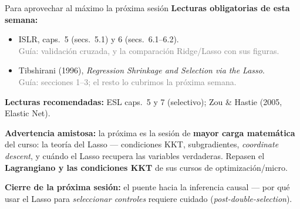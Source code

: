 \documentclass{beamer}
\newcommand{\1}{\mathbb{I}}
\begin{document}
\begin{frame}{Para aprovechar al máximo la próxima sesión}
\small
\textbf{Lecturas obligatorias de esta semana:}
\begin{itemize}\itemsep4pt
  \item ISLR, caps.\ 5 (secs.\ 5.1) y 6 (secs.\ 6.1--6.2). \\ \textcolor{gray}{Guía: validación cruzada, y la comparación Ridge/Lasso con sus figuras.}
  \item Tibshirani (1996), \emph{Regression Shrinkage and Selection via the Lasso}. \\ \textcolor{gray}{Guía: secciones 1--3; el resto lo cubrimos la próxima semana.}
\end{itemize}

\textbf{Lecturas recomendadas:} ESL caps.\ 5 y 7 (selectivo); Zou \& Hastie (2005, Elastic Net).
\pause

\vspace{0.2cm}
\textbf{Advertencia amistosa:} la próxima es la sesión de \textbf{mayor carga matemática} del curso: la teoría del Lasso --- condiciones KKT, subgradientes, \emph{coordinate descent}, y cuándo el Lasso recupera las variables verdaderas. Repasen el \textbf{Lagrangiano y las condiciones KKT} de sus cursos de optimización/micro.
\pause

\vspace{0.2cm}
\textbf{Cierre de la próxima sesión:} el puente hacia la inferencia causal --- por qué usar el Lasso para \emph{seleccionar controles} requiere cuidado (\emph{post-double-selection}).
\end{frame}
\end{document}
